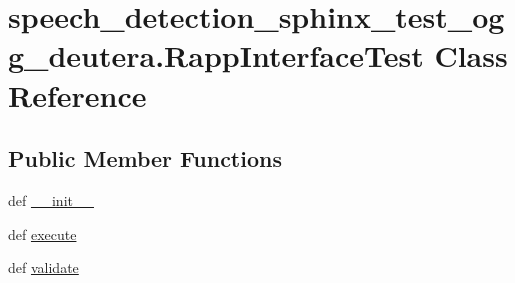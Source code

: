 \hypertarget{classspeech__detection__sphinx__test__ogg__deutera_1_1RappInterfaceTest}{\section{speech\-\_\-detection\-\_\-sphinx\-\_\-test\-\_\-ogg\-\_\-deutera.\-Rapp\-Interface\-Test Class Reference}
\label{classspeech__detection__sphinx__test__ogg__deutera_1_1RappInterfaceTest}
}
\subsection*{Public Member Functions}
\begin{DoxyCompactItemize}
\item 
def \hyperlink{classspeech__detection__sphinx__test__ogg__deutera_1_1RappInterfaceTest_ae2c3fb86fa797ab30903751d8d685683}{\-\_\-\-\_\-init\-\_\-\-\_\-}
\item 
def \hyperlink{classspeech__detection__sphinx__test__ogg__deutera_1_1RappInterfaceTest_ad74b73192bbf1550888a0a55aa7ae64b}{execute}
\item 
def \hyperlink{classspeech__detection__sphinx__test__ogg__deutera_1_1RappInterfaceTest_a8d2d51cfa07eeb30e8adb985fa20a030}{validate}
\end{DoxyCompactItemize}

